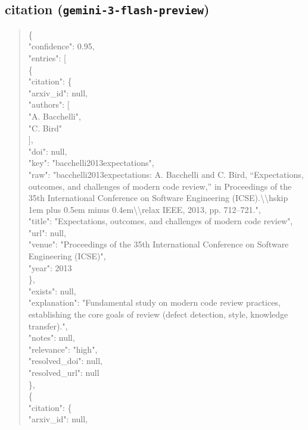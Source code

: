 \documentclass[11pt]{article}
\begin{document}
\subsection*{citation (\texttt{gemini-3-flash-preview})}
\begin{quote}\small\ttfamily\raggedright
\{\\
  "confidence": 0.95,\\
  "entries": [\\
    \{\\
      "citation": \{\\
        "arxiv\_id": null,\\
        "authors": [\\
          "A. Bacchelli",\\
          "C. Bird"\\
        ],\\
        "doi": null,\\
        "key": "bacchelli2013expectations",\\
        "raw": "bacchelli2013expectations: A. Bacchelli and C. Bird, ``Expectations, outcomes, and challenges of modern code review,'' in Proceedings of the 35th International Conference on Software Engineering (ICSE).\textbackslash{}\textbackslash{}hskip 1em plus 0.5em minus 0.4em\textbackslash{}\textbackslash{}relax IEEE, 2013, pp. 712--721.",\\
        "title": "Expectations, outcomes, and challenges of modern code review",\\
        "url": null,\\
        "venue": "Proceedings of the 35th International Conference on Software Engineering (ICSE)",\\
        "year": 2013\\
      \},\\
      "exists": null,\\
      "explanation": "Fundamental study on modern code review practices, establishing the core goals of review (defect detection, style, knowledge transfer).",\\
      "notes": null,\\
      "relevance": "high",\\
      "resolved\_doi": null,\\
      "resolved\_url": null\\
    \},\\
    \{\\
      "citation": \{\\
        "arxiv\_id": null,\\

\end{quote}
\end{document}
